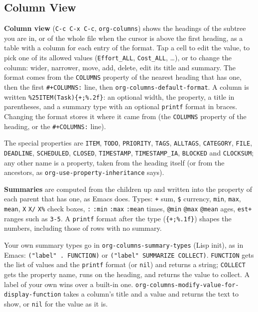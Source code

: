 \documentclass[11pt]{article}
\begin{document}
\subsection{Column View}
\label{sec:orgc54f9dd}
\textbf{Column view} (\texttt{C-c C-x C-c}, \texttt{org-columns}) shows the headings of the subtree you are in, or of the whole file when the cursor is above the first heading, as a table with a column for each entry of the format. Tap a cell to edit the value, to pick one of its allowed values (\texttt{Effort\_ALL}, \texttt{Cost\_ALL}, \ldots{}), or to change the column: wider, narrower, move, add, delete, edit its title and summary. The format comes from the \texttt{COLUMNS} property of the nearest heading that has one, then the first \texttt{\#+COLUMNS:} line, then \texttt{org-columns-default-format}. A column is written \texttt{\%25ITEM(Task)\{+;\%.2f\}}: an optional width, the property, a title in parentheses, and a summary type with an optional \texttt{printf} format in braces. Changing the format stores it where it came from (the \texttt{COLUMNS} property of the heading, or the \texttt{\#+COLUMNS:} line).

The special properties are \texttt{ITEM}, \texttt{TODO}, \texttt{PRIORITY}, \texttt{TAGS}, \texttt{ALLTAGS}, \texttt{CATEGORY}, \texttt{FILE}, \texttt{DEADLINE}, \texttt{SCHEDULED}, \texttt{CLOSED}, \texttt{TIMESTAMP}, \texttt{TIMESTAMP\_IA}, \texttt{BLOCKED} and \texttt{CLOCKSUM}; any other name is a property, taken from the heading itself (or from the ancestors, as \texttt{org-use-property-inheritance} says).

\textbf{Summaries} are computed from the children up and written into the property of each parent that has one, as Emacs does. Types: \texttt{+} sum, \texttt{\$} currency, \texttt{min}, \texttt{max}, \texttt{mean}, \texttt{X} \texttt{X/} \texttt{X\%} check boxes, \texttt{:} \texttt{:min} \texttt{:max} \texttt{:mean} times, \texttt{@min} \texttt{@max} \texttt{@mean} ages, \texttt{est+} ranges such as \texttt{3-5}. A \texttt{printf} format after the type (\texttt{\{+;\%.1f\}}) shapes the numbers, including those of rows with no summary.

Your own summary types go in \texttt{org-columns-summary-types} (Lisp init), as in Emacs: \texttt{("label" . FUNCTION)} or \texttt{("label" SUMMARIZE COLLECT)}. \texttt{FUNCTION} gets the list of values and the \texttt{printf} format (or \texttt{nil}) and returns a string; \texttt{COLLECT} gets the property name, runs on the heading, and returns the value to collect. A label of your own wins over a built-in one. \texttt{org-columns-modify-value-for-display-function} takes a column's title and a value and returns the text to show, or \texttt{nil} for the value as it is.
\end{document}
